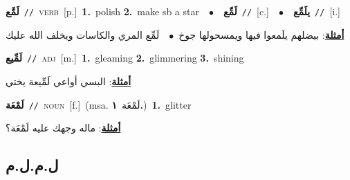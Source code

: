 \documentclass[10pt,a4paper,twoside]{article} %
\begin{document}
\begin{multicols}{2}
{\setlength\topsep{0pt}\textbf{\foreignlanguage{arabic}{لَمَّع}}\ {\color{gray}\texttt{//}\color{black}}\ \textsc{verb}\ [p.]\ \textbf{1.}~polish  \textbf{2.}~make sb a star\ \ $\bullet$\ \ \setlength\topsep{0pt}\textbf{\foreignlanguage{arabic}{لَمِّع}}\ {\color{gray}\texttt{//}\color{black}}\ [c.]\ \ $\bullet$\ \ \setlength\topsep{0pt}\textbf{\foreignlanguage{arabic}{يلَمِّع}}\ {\color{gray}\texttt{//}\color{black}}\ [i.]\  \begin{flushright}\color{gray}\foreignlanguage{arabic}{\textbf{\underline{\foreignlanguage{arabic}{أمثلة}}}: بيضلهم يلَمعوا فيها ويمسحولها جوخ\ $\bullet$\ \  لَمِّع المري والكاسات ويخلف الله عليك}\end{flushright}\color{black}} \vspace{2mm}

{\setlength\topsep{0pt}\textbf{\foreignlanguage{arabic}{لَمِّيع}}\ {\color{gray}\texttt{//}\color{black}}\ \textsc{adj}\ [m.]\ \textbf{1.}~gleaming  \textbf{2.}~glimmering  \textbf{3.}~shining\  \begin{flushright}\color{gray}\foreignlanguage{arabic}{\textbf{\underline{\foreignlanguage{arabic}{أمثلة}}}: البسي أواعي لَمِّيعة يختي}\end{flushright}\color{black}} \vspace{2mm}

{\setlength\topsep{0pt}\textbf{\foreignlanguage{arabic}{لَمْعَة}}\ {\color{gray}\texttt{//}\color{black}}\ \textsc{noun}\ [f.]\ \color{gray}(msa. \foreignlanguage{arabic}{لَمْعَة}~\foreignlanguage{arabic}{\textbf{١.}})\color{black}\ \textbf{1.}~glitter\  \begin{flushright}\color{gray}\foreignlanguage{arabic}{\textbf{\underline{\foreignlanguage{arabic}{أمثلة}}}: ماله وجهك عليه لَمْعَة؟}\end{flushright}\color{black}} \vspace{2mm}

\vspace{-3mm}
\subsection*{\color{blue}\foreignlanguage{arabic}{ل.م.ل.م}\color{blue}{}} 


\end{multicols}
\end{document}
